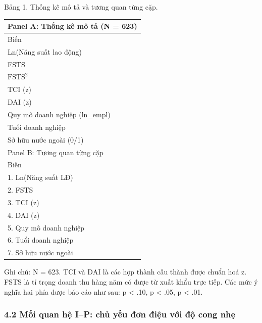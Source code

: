 \documentclass[12pt,a4paper]{article}
\begin{document}
Bảng 1. Thống kê mô tả và tương quan từng cặp.

\begin{longtable}[]{@{}l@{}}
\toprule\noalign{}
Panel A: Thống kê mô tả (N = 623) \\
\midrule\noalign{}
\endhead
\bottomrule\noalign{}
\endlastfoot
Biến \\
Ln(Năng suất lao động) \\
FSTS \\
\(\mathrm{FSTS}^2\) \\
TCI (z) \\
DAI (z) \\
Quy mô doanh nghiệp (ln\_empl) \\
Tuổi doanh nghiệp \\
Sở hữu nước ngoài (0/1) \\
Panel B: Tương quan từng cặp \\
Biến \\
1. Ln(Năng suất LĐ) \\
2. FSTS \\
3. TCI (z) \\
4. DAI (z) \\
5. Quy mô doanh nghiệp \\
6. Tuổi doanh nghiệp \\
7. Sở hữu nước ngoài \\
\end{longtable}

Ghi chú: N = 623. TCI và DAI là các hợp thành cấu thành được chuẩn hoá
z. FSTS là tỉ trọng doanh thu hàng năm có được từ xuất khẩu trực tiếp.
Các mức ý nghĩa hai phía được báo cáo như sau: p \textless{} .10, p
\textless{} .05, p \textless{} .01.

\hypertarget{42-mux1ed1i-quan-hux1ec7-ip-chux1ee7-yux1ebfu-ux111ux1a1n-ux111iux1ec7u-vux1edbi-ux111ux1ed9-cong-nhux1eb9}{%
\subsubsection{4.2 Mối quan hệ I--P: chủ yếu đơn điệu với độ cong
nhẹ}\label{42-mux1ed1i-quan-hux1ec7-ip-chux1ee7-yux1ebfu-ux111ux1a1n-ux111iux1ec7u-vux1edbi-ux111ux1ed9-cong-nhux1eb9}}
\end{document}
